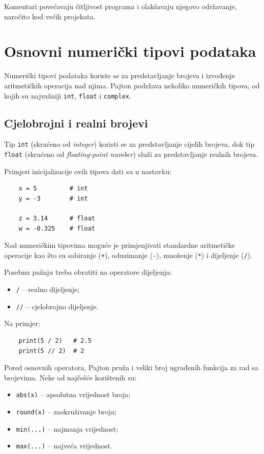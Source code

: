  Komentari povećavaju čitljivost programa i olakšavaju njegovo održavanje, naročito kod većih projekata.
 

\section{Osnovni numerički tipovi podataka}

Numerički tipovi podataka koriste se za predstavljanje brojeva i izvođenje aritmetičkih operacija nad njima. Pajton podržava nekoliko numeričkih tipova, od kojih su najvažniji \texttt{int}, \texttt{float} i \texttt{complex}.

\subsection{Cjelobrojni i realni brojevi}

Tip \texttt{int} (skraćeno od \textit{integer}) koristi se za predstavljanje cijelih brojeva, dok tip \texttt{float} (skraćeno od \textit{floating-point number}) služi za predstavljanje realnih brojeva.

Primjeri inicijalizacije ovih tipova dati su u nastavku:

\begin{verbatim}
	x = 5         # int
	y = -3        # int
	
	z = 3.14      # float
	w = -0.325    # float
\end{verbatim}

Nad numeričkim tipovima moguće je primjenjivati standardne aritmetičke operacije kao što su sabiranje (\texttt{+}), oduzimanje (\texttt{-}), množenje (\texttt{*}) i dijeljenje (\texttt{/}).

Posebnu pažnju treba obratiti na operatore dijeljenja:

\begin{itemize}
	\item \texttt{/} -- realno dijeljenje;
	\item \texttt{//} -- cjelobrojno dijeljenje.
\end{itemize}

Na primjer:

\begin{verbatim}
	print(5 / 2)   # 2.5
	print(5 // 2)  # 2
\end{verbatim}

Pored osnovnih operatora, Pajton pruža i veliki broj ugrađenih funkcija za rad sa brojevima. Neke od najčešće korištenih su:

\begin{itemize}
	\item \texttt{abs(x)} -- apsolutna vrijednost broja;
	\item \texttt{round(x)} -- zaokruživanje broja;
	\item \texttt{min(...)} -- najmanja vrijednost;
	\item \texttt{max(...)} -- najveća vrijednost.
\end{itemize}

